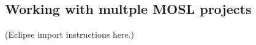 \newpage
\subsection{Working with multple MOSL projects}
\texHeader
\label{sec:multiMOSL}

(Eclipse import instructions here.)